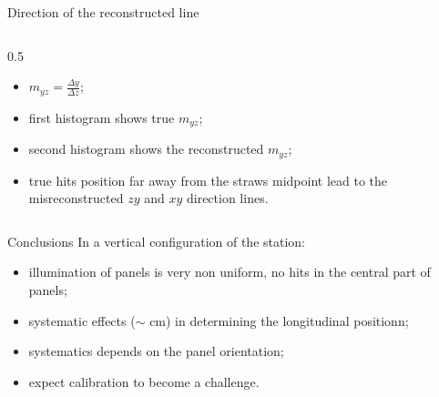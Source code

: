 \documentclass{beamer}[10pt]
\begin{document}
\begin{frame}{Direction of the reconstructed line}
\begin{columns}
\begin{column}{0.5\framewidth}
  \begin{itemize}
      
    \item $m_{yz}=\frac{\Delta y}{\Delta z}$;
    \vspace{2mm}
    \item first histogram shows true $m_{yz}$;
    \vspace{2mm}
    \item second histogram shows the reconstructed $m_{yz}$;
    \vspace{2mm}
    \item true hits position far away from the straws midpoint lead to the misreconstructed $zy$ and $xy$ direction lines.
  \end{itemize}
\end{column}
\end{columns}
\end{frame}


\begin{frame}{Conclusions}
  In a vertical configuration of the station:
  \vspace{6mm}
  \begin{itemize}
    \item illumination of panels is very non uniform, no hits in the central part of panels;
    \vspace{4mm}
    \item systematic effects ($\sim$ cm) in determining the longitudinal
    positionn;
    \vspace{4mm}
    \item systematics depends on the panel orientation;
    \vspace{4mm}
    \item expect calibration to become a challenge.
  \end{itemize}
\end{frame}
\end{document}
